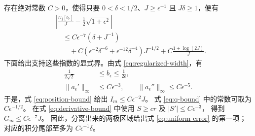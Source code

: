 \documentclass[aps,pra,reprint,superscriptaddress,longbibliography]{revtex4-2}
\theoremstyle{remark}
\newcommand{\norm}[1]{\lVert#1\rVert}
\begin{document}
存在绝对常数 $C>0$，使得只要 $0<\delta<1/2$、$J\geq\epsilon^{-1}$
且 $J\delta\geq1$，便有
\begin{equation}
\begin{aligned}
&\left|\frac{U_j[b_\epsilon]}J-\frac12\sqrt{1+\epsilon^2}\right|\\
&\quad\leq C\epsilon^{-7}(\delta+J^{-1})\\
&\qquad{}+C(\epsilon^{-2}\delta^{-6}
             +\epsilon^{-12}\delta^{-4})J^{-1/2}
       +C\frac{1+\log(2J)}J.
\end{aligned}
\label{eq:uniform-error}
\end{equation}
下面给出支持这些指数的显式界。由式 \eqref{eq:regularized-width}，有
\begin{equation}
\begin{aligned}
\frac1{2\sqrt2}&\leq b_\epsilon\leq\frac1{2\epsilon},\\
\norm{a_\epsilon'}_\infty&\leq C\epsilon^{-3},\qquad
\norm{a_\epsilon''}_\infty\leq C\epsilon^{-5}.
\end{aligned}
\label{eq:parameter-bounds}
\end{equation}
于是，式 \eqref{eq:position-bound} 给出 $I_m\leq C\epsilon^{-2}J$。
式 \eqref{eq:q-bound} 中的常数可取为 $C\epsilon^{-1/2}$。
在式 \eqref{eq:derivative-bound} 中使用 $S\geq cr$ 及 $|S'|\leq C\epsilon^{-3}$，
得到 $G_m\leq C\epsilon^{-7}J$。
因此，分离出来的两极区域给出式 \eqref{eq:uniform-error} 的第一项；
对应的积分尾部至多为 $C\epsilon^{-1}\delta$。
\end{document}
